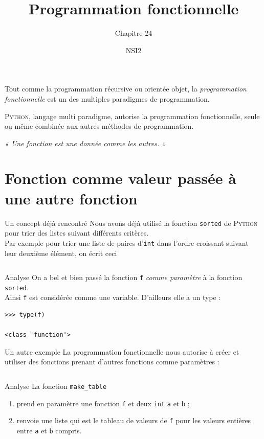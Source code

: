 \documentclass[10pt]{beamer}
\title{Programmation fonctionnelle}
\subtitle{Chapitre 24}
\author{NSI2}
\begin{document}
\maketitle


\begin{frame}{}
	Tout comme la programmation récursive ou orientée objet, la \textit{programmation fonctionnelle} est un des multiples paradigmes de programmation.\\
\pause

\textsc{Python}, langage multi paradigme, autorise la programmation fonctionnelle, seule ou même combinée aux autres méthodes de programmation.\\\pause

\textit{« Une fonction est une donnée comme les autres. »}
\end{frame}



\section{Fonction comme valeur passée à une autre fonction}

\begin{frame}[fragile]{Un concept déjà rencontré}
	Nous avons déjà utilisé la fonction \texttt{sorted} de \textsc{Python} pour trier des listes suivant différents critères.\\\pause
Par exemple pour trier une liste de paires d'\texttt{int} dans l'ordre croissant suivant leur deuxième élément, on écrit ceci\pause

\inputminted{python}{scripts/sort1.py}
\end{frame}

\begin{frame}[fragile]{Analyse}
On a bel et bien passé la fonction \texttt{f} \textit{comme paramètre} à la fonction \texttt{sorted}.\\\pause
Ainsi \texttt{f} est considérée comme une variable. D'ailleurs elle a un type :\pause
\begin{verbatim}
>>> type(f)

<class 'function'>
\end{verbatim}
\end{frame} 

\begin{frame}[fragile]{Un autre exemple}
La programmation fonctionnelle nous autorise à créer et utiliser des fonctions prenant d'autres fonctions comme paramètres :\pause

\inputminted{python}{scripts/func1.py}
\end{frame}
\begin{frame}{Analyse}
La fonction \texttt{make\_table}\pause
\begin{enumerate}[--]
	\item 	prend en paramètre une fonction \texttt{f} et deux \texttt{int} \texttt{a} et \texttt{b} ;\pause
	\item 	renvoie une liste qui est le tableau de valeurs de \texttt{f} pour les valeurs entières entre \texttt{a} et \texttt{b} compris.	
\end{enumerate}
\end{frame}
\end{document}

